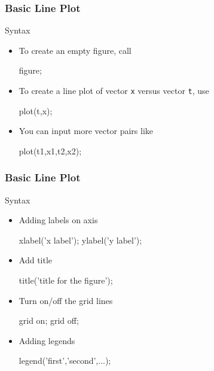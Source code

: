 \documentclass[compress]{beamer}  %
\begin{document}
\begin{frame}[fragile]
\frametitle{Basic Line Plot}

\begin{block}{Syntax}
\begin{itemize}[<+->]
    \item To create an empty figure, call
          \begin{matlabcodebeamer}[frame=none]
          figure;
          \end{matlabcodebeamer}
    \item To create a line plot of vector \texttt{x} versus vector \texttt{t}, use
          \begin{matlabcodebeamer}[frame=none]
          plot(t,x);
          \end{matlabcodebeamer}
    \item You can input more vector pairs like
          \begin{matlabcodebeamer}[frame=none]
          plot(t1,x1,t2,x2);
          \end{matlabcodebeamer}
\end{itemize}
\end{block}
\end{frame}
\begin{frame}[fragile]
\frametitle{Basic Line Plot}

\begin{block}{Syntax}
\begin{itemize}[<+->]
    \item Adding labels on axis 
          \begin{matlabcodebeamer}[frame=none]
          xlabel('x label');
          ylabel('y label');
          \end{matlabcodebeamer}
    \item Add title
          \begin{matlabcodebeamer}[frame=none]
          title('title for the figure');
          \end{matlabcodebeamer}
    \item Turn on/off the grid lines
          \begin{matlabcodebeamer}[frame=none]
          grid on;
          grid off;
          \end{matlabcodebeamer}
    \item Adding legends
          \begin{matlabcodebeamer}[frame=none]
          legend('first','second',...);
          \end{matlabcodebeamer}
\end{itemize}
\end{block}
\end{frame}
\end{document}
